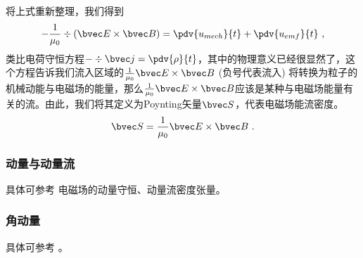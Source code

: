 将上式重新整理，我们得到
$$
- \frac{1}{\mu_0} \div(\bvec E \times \bvec B) = \pdv{u_{mech}}{t} + \pdv{u_{emf}}{t}~,
$$
类比电荷守恒方程$-\div \bvec j = \pdv{\rho}{t}$，其中的物理意义已经很显然了，这个方程告诉我们流入区域的$\frac{1}{\mu_0} \bvec E \times \bvec B$ (负号代表流入) 将转换为粒子的机械动能与电磁场的能量，那么$ \frac{1}{\mu_0} \bvec E \times \bvec B$应该是某种与电磁场能量有关的流。由此，我们将其定义为Poynting矢量$\bvec S$，代表电磁场能流密度。
$$
\bvec S = \frac{1}{\mu_0} \bvec E \times \bvec B~.
$$

\subsubsection{动量与动量流}
具体可参考 电磁场的动量守恒、动量流密度张量。

\subsubsection{角动量}
具体可参考 \cite{GriffE}。
